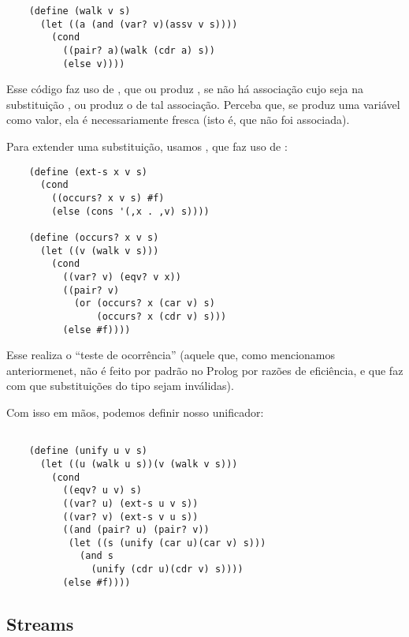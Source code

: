   \begin{lstlisting}
    (define (walk v s)
      (let ((a (and (var? v)(assv v s))))
        (cond
          ((pair? a)(walk (cdr a) s))
          (else v))))
  \end{lstlisting}

  \noindent Esse código faz uso de , que ou produz
  , se não há associação cujo  seja
   na substituição , ou produz o
   de tal associação. Perceba que, se 
  produz uma variável como valor, ela é necessariamente fresca (isto
  é, que não foi associada).

  Para extender uma substituição, usamos , que faz
  uso de :

  \begin{lstlisting}
    (define (ext-s x v s)
      (cond
        ((occurs? x v s) #f)
        (else (cons '(,x . ,v) s))))

    (define (occurs? x v s)
      (let ((v (walk v s)))
        (cond
          ((var? v) (eqv? v x))
          ((pair? v)
            (or (occurs? x (car v) s)
                (occurs? x (cdr v) s)))
          (else #f))))
  \end{lstlisting}

  Esse  realiza o ``teste de ocorrência'' (aquele
  que, como mencionamos anteriormenet, não é feito por padrão no
  Prolog por razões de eficiência, e que faz com que substituições do
  tipo  sejam inválidas).

  Com isso em mãos, podemos definir nosso unificador:

  \begin{lstlisting}

    (define (unify u v s)
      (let ((u (walk u s))(v (walk v s)))
        (cond
          ((eqv? u v) s)
          ((var? u) (ext-s u v s))
          ((var? v) (ext-s v u s))
          ((and (pair? u) (pair? v))
           (let ((s (unify (car u)(car v) s)))
             (and s
               (unify (cdr u)(cdr v) s))))
          (else #f))))

  \end{lstlisting}

  \subsection{Streams}

